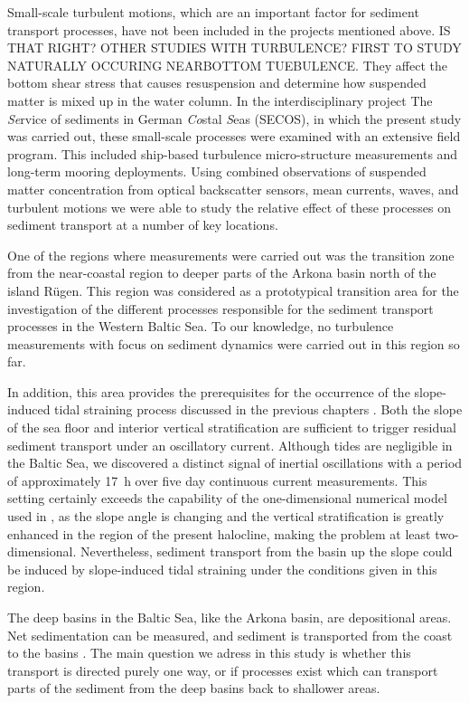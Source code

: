 Small-scale turbulent motions, which are an important 
factor for sediment 
transport processes, have not been included in the projects mentioned above. IS 
THAT RIGHT? OTHER STUDIES WITH TURBULENCE? FIRST TO STUDY NATURALLY OCCURING 
NEARBOTTOM TUEBULENCE. 
They affect the bottom shear stress that causes resuspension and determine how 
suspended matter is mixed up in the water column. In the interdisciplinary 
project The \textit{Se}rvice of sediments in German \textit{Co}stal 
\textit{S}eas (SECOS), in which the present study was carried out, these 
small-scale processes were examined with an extensive field program. This 
included ship-based turbulence micro-structure measurements and long-term 
mooring 
deployments. Using combined observations of suspended matter concentration 
from optical backscatter sensors, mean currents, waves, and turbulent motions we 
were able to study the relative effect of these processes on sediment transport 
at a number of key locations.

One of the regions where measurements were carried out was the 
transition zone from the near-coastal region to deeper parts of the Arkona 
basin north of the island 
R\"{u}gen. This region was considered as a prototypical transition area for the 
investigation of the different processes responsible for the sediment transport 
processes in the Western Baltic Sea. To our knowledge, 
no turbulence measurements with focus on sediment dynamics were carried out in 
this region so far.
 
In addition, this area provides the prerequisites for the occurrence of 
the slope-induced tidal straining process discussed in the previous chapters 
\citep[][]{UmlaufBurchard2011a, 
schulzumlauf2016}. Both the slope of the sea floor and 
interior vertical stratification are sufficient to trigger residual sediment 
transport under an oscillatory current. Although tides are negligible in the 
Baltic Sea, we discovered a distinct signal of inertial oscillations with a 
period of approximately 17~h over five day continuous 
current measurements. This setting certainly exceeds the capability of the 
one-dimensional numerical model used in \cite{schulzumlauf2016}, as the slope 
angle is changing and the vertical stratification is greatly enhanced in the 
region of the present halocline, making the problem at least two-dimensional. 
Nevertheless, sediment transport from the basin up the slope could be induced 
by slope-induced tidal straining under the conditions given in this region.
 
 The deep basins in the Baltic Sea, like the Arkona basin, are depositional 
areas. Net sedimentation can be measured, and sediment is transported from the 
coast to the basins \citep[][]{basys1, basys2}. The main question we adress in 
this study is whether this transport is directed purely one way, or if processes 
exist which can transport parts of the sediment from the deep basins back to 
shallower areas.

